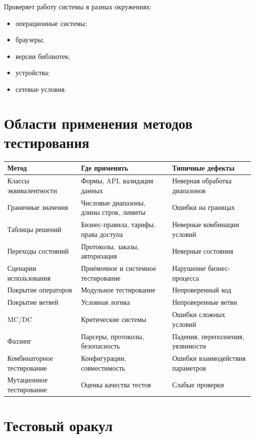 \documentclass[12pt,a4paper]{article}
\begin{document}
Проверяет работу системы в разных окружениях:

\begin{itemize}
    \item операционные системы;
    \item браузеры;
    \item версии библиотек;
    \item устройства;
    \item сетевые условия.
\end{itemize}

\section{Области применения методов тестирования}

\begin{center}
\begin{tabular}{p{4cm} p{8cm} p{3cm}}
\toprule
\textbf{Метод} & \textbf{Где применять} & \textbf{Типичные дефекты} \\
\midrule
Классы эквивалентности & Формы, API, валидация данных & Неверная обработка диапазонов \\
Граничные значения & Числовые диапазоны, длины строк, лимиты & Ошибки на границах \\
Таблицы решений & Бизнес-правила, тарифы, права доступа & Неверные комбинации условий \\
Переходы состояний & Протоколы, заказы, авторизация & Неверные состояния \\
Сценарии использования & Приёмочное и системное тестирование & Нарушение бизнес-процесса \\
Покрытие операторов & Модульное тестирование & Непроверенный код \\
Покрытие ветвей & Условная логика & Непроверенные ветви \\
MC/DC & Критические системы & Ошибки сложных условий \\
Фаззинг & Парсеры, протоколы, безопасность & Падения, переполнения, уязвимости \\
Комбинаторное тестирование & Конфигурации, совместимость & Ошибки взаимодействия параметров \\
Мутационное тестирование & Оценка качества тестов & Слабые проверки \\
\bottomrule
\end{tabular}
\end{center}

\section{Тестовый оракул}
\end{document}
